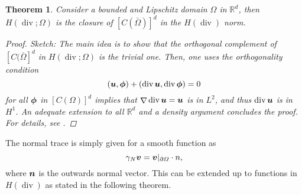 \documentclass{article}
\renewcommand{\vec}{\vectorsym}
\DeclareMathOperator{\grad}{\nabla}
\DeclareMathOperator{\dive}{\text{div}}
\newcommand{\R}{\mathbb{R}}
\newtheorem{theorem}{Theorem}
\begin{document}
\begin{theorem} Consider a bounded and Lipschitz domain $\Omega$ in $\R^d$, then $H(\dive;\Omega)$ is the closure of $[C(\bar\Omega)]^d$ in the $H(\dive)$ norm.
    \begin{proof}
        Sketch: The main idea is to show that the orthogonal complement of $[C(\bar\Omega]^d$ in $H(\dive;\Omega)$ is the trivial one. Then, one uses the orthogonality condition 
            $$ (\vec u, \vec \phi) + (\dive \vec u, \dive \vec \phi) = 0$$
        for all $\vec\phi$ in $[C(\Omega)]^d$ implies that $\grad \dive\vec u = \vec u$ is in $L^2$, and thus $\dive \vec u$ is in $H^1$. An adequate extension to all $\R^d$ and a density argument concludes the proof. For details, see \cite[Thm 3.22]{monk2003finite}. 
    \end{proof}
\end{theorem}
The normal trace is simply given for a smooth function as 
    $$ \gamma_N \vec v = \vec v|_{\partial\Omega} \cdot n, $$
where $\vec n $ is the outwards normal vector. This can be extended up to functions in $H(\dive)$ as stated in the following theorem. 
\end{document}
